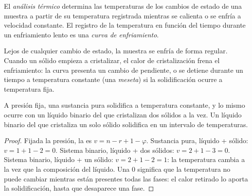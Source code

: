 \begin{definition}\label{def:b2:solid-liquid-diagrams:cooling-curve}
El \emph{análisis térmico} determina las temperaturas de
los cambios de estado de una muestra a partir de su temperatura registrada mientras se
calienta o se enfría a velocidad constante. El registro de la temperatura en función del tiempo
durante un enfriamiento lento es una \emph{curva de enfriamiento}.
\end{definition}

Lejos de cualquier cambio de estado, la muestra se enfría de forma regular. Cuando un sólido empieza a
cristalizar, el calor de cristalización frena el enfriamiento: la curva presenta un
cambio de pendiente, o se detiene durante un tiempo a temperatura constante (una
\textit{meseta}) si la solidificación ocurre a temperatura fija.

\begin{proposition}[Mesetas]\label{prop:b2:solid-liquid-diagrams:plateaus}
A presión fija, una sustancia pura solidifica a temperatura constante, y lo mismo
ocurre con un líquido binario del que cristalizan dos sólidos a la vez. Un líquido binario
del que cristaliza un solo sólido solidifica en un intervalo de temperaturas.
\end{proposition}

\begin{proof}
Fijada la presión, la  es $v = n - r + 1 - \varphi$. Sustancia
pura, líquido + sólido: $v = 1 + 1 - 2 = 0$. Sistema binario, líquido + dos sólidos:
$v = 2 + 1 - 3 = 0$. Sistema binario, líquido + un sólido: $v = 2 + 1 - 2 = 1$: la
temperatura cambia a la vez que la composición del líquido. Una  0 significa que la
temperatura no puede cambiar mientras están presentes todas las fases: el calor retirado lo
aporta la solidificación, hasta que desaparece una fase.
\end{proof}

